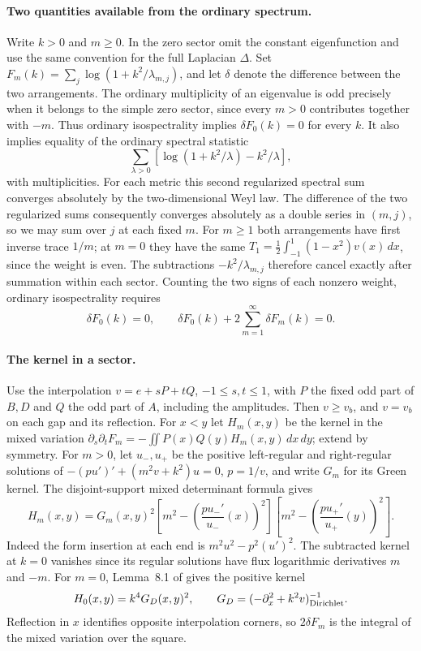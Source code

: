 \documentclass[11pt,letterpaper]{article}
\begin{document}
\paragraph{Two quantities available from the ordinary spectrum.}
Write \(k>0\) and \(m\geq0\). In the zero sector omit the constant
eigenfunction and use the same convention for the full Laplacian
\(\Delta\). Set \(F_m(k)=\sum_j\log(1+k^2/\lambda_{m,j})\), and let
\(\delta\) denote the difference between the two arrangements. The ordinary
multiplicity of an eigenvalue is odd precisely when it belongs to the
simple zero sector, since every \(m>0\) contributes together with \(-m\).
Thus ordinary isospectrality implies \(\delta F_0(k)=0\) for every \(k\).
It also implies equality of the ordinary spectral statistic
\[
 \sum_{\lambda>0}
 \left[\log(1+k^2/\lambda)-k^2/\lambda\right],
\]
with multiplicities. For each metric this second regularized spectral sum
converges absolutely by the two-dimensional Weyl law. The difference of
the two regularized sums consequently converges absolutely as a double
series in \((m,j)\), so we may sum over \(j\) at each fixed \(m\).
For \(m\geq1\) both arrangements have first inverse trace \(1/m\);
at \(m=0\) they have the same
\(T_1=\tfrac12\int_{-1}^1(1-x^2)v(x)\,dx\), since the weight is even.
The subtractions \(-k^2/\lambda_{m,j}\) therefore cancel exactly after
summation within each sector. Counting the two signs of each nonzero
weight, ordinary isospectrality requires
\[
 \delta F_0(k)=0,\qquad
 \delta F_0(k)+2\sum_{m=1}^{\infty}\delta F_m(k)=0.
 \tag{O1}
\]

\paragraph{The kernel in a sector.}
Use the interpolation \(v=e+sP+tQ\), \(-1\leq s,t\leq 1\), with \(P\)
the fixed odd part of \(B,D\) and \(Q\) the odd part of \(A\), including
the amplitudes. Then \(v\geq v_b\), and \(v=v_b\) on each gap and its
reflection. For \(x<y\) let \(H_m(x,y)\) be the kernel in the mixed
variation \(\partial_s\partial_t F_m=-\iint P(x)Q(y)H_m(x,y)\,dx\,dy\);
extend by symmetry. For \(m>0\), let \(u_-,u_+\) be the positive
left-regular and right-regular solutions of
\(- (pu')'+(m^2v+k^2)u=0\), \(p=1/v\), and write \(G_m\)
for its Green kernel. The disjoint-support mixed determinant formula gives
\[
 H_m(x,y)=G_m(x,y)^2
 \left[m^2-\left(\frac{pu_-'}{u_-}(x)\right)^2\right]
 \left[m^2-\left(\frac{pu_+'}{u_+}(y)\right)^2\right].
 \tag{O2}
\]
Indeed the form insertion at each end is \(m^2u^2-p^2(u')^2\).
The subtracted kernel at \(k=0\) vanishes since its regular solutions
have flux logarithmic derivatives \(m\) and \(-m\). For \(m=0\),
Lemma~8.1 of \cite{original} gives the positive kernel
\[
 H_0(x,y)=k^4 G_D(x,y)^2,\qquad
 G_D=(-\partial_x^2+k^2v)^{-1}_{\rm Dirichlet}.
\]
Reflection in \(x\) identifies opposite interpolation corners, so
\(2\delta F_m\) is the integral of the mixed variation over the square.
\end{document}
